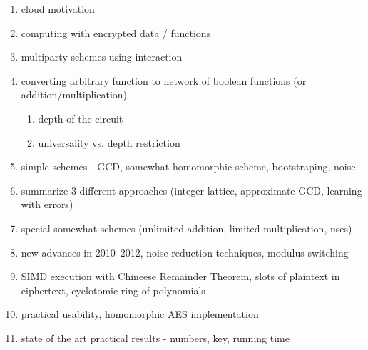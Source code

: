 \documentclass[11pt,oneside,final]{fithesis2}
\begin{document}
    \begin{enumerate}
     \item cloud motivation
     \item computing with encrypted data / functions
     \item multiparty schemes using interaction
     \item converting arbitrary function to network of boolean functions (or addition/multiplication)
	\begin{enumerate}
	 \item depth of the circuit
	 \item universality vs. depth restriction
	\end{enumerate}
    
%
    
    
     \item simple schemes - GCD, somewhat homomorphic scheme, bootstraping, noise
     \item summarize 3 different approaches (integer lattice, approximate GCD, learning with errors)
     \item special somewhat schemes (unlimited addition, limited multiplication, uses)
     \item new advances in 2010--2012, noise reduction techniques, modulus switching
     \item SIMD execution with Chineese Remainder Theorem, slots of plaintext in ciphertext, cyclotomic ring of polynomials
     \item practical usability, homomorphic AES implementation
     \item state of the art practical results - numbers, key, running time
    \end{enumerate}
\end{document}
